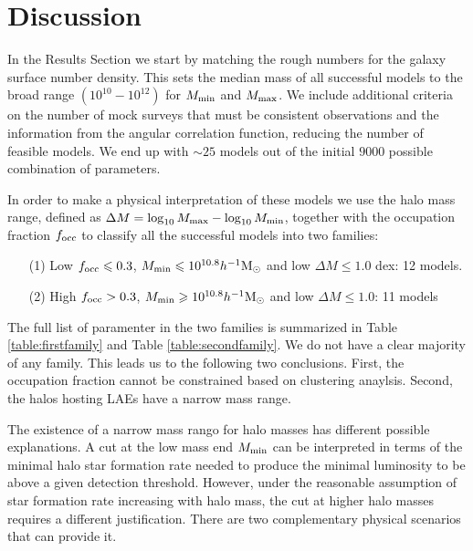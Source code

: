 \documentclass[usenatbib]{mn2e}
\newcommand{\ly}{{\ifmmode{{\rm Ly}\alpha}\else{Ly$\alpha$~}\fi}}
\newcommand{\hMsun}{{\ifmmode{h^{-1}{\rm
        {M_{\odot}}}}\else{$h^{-1}{\rm{M_{\odot}}}$}\fi}}
\begin{document}
\section{Discussion}





In the Results Section we start by matching the rough numbers for the
galaxy surface number density. This sets the median mass of all
successful models to the broad range $(10^{10}-10^{12})$ \hMsun for
$M_{\rm min}$ and $M_{\rm max}$. We include additional criteria on the
number of mock surveys that must be consistent observations
and the information from the angular correlation function, reducing
the number of feasible models. We end up with $\sim 25$ models out of
the initial $9000$ possible combination of parameters. 

In order to make a physical interpretation of these models we use 
the halo mass range, defined as $\Delta M=\log_{10}M_{\rm max} -
\log_{10}M_{\rm  min}$, together with the occupation fraction $f_{\rm
  occ}$ to classify all the successful models into two families:  


\begin{itemize}
\item[(1)] Low $f_{\rm occ}\leq 0.3$, $M_{\rm min}\leq 10^{10.8}\hMsun$ and low $\Delta M\leq 1.0$
  dex: 12 models. 
\item[(2)] High $f_{\rm occ}> 0.3$, $M_{\rm min}\geq 10^{10.8}\hMsun$ and
  low $\Delta M\leq 1.0$: 11 models 
\end{itemize}


The full list of paramenter in the two families is summarized in Table
\ref{table:firstfamily} and Table \ref{table:secondfamily}. We do not
have a clear majority of any family. This leads us to the following
two conclusions. First, the occupation fraction cannot be constrained
based on clustering anaylsis. Second, the halos hosting LAEs have a
narrow mass range.  

The existence of a narrow mass rango for halo masses has different
possible explanations. A cut at the low mass end $M_{\rm min}$ can be
interpreted in terms of the minimal halo star formation rate needed to
produce the minimal \ly  luminosity to be above a given detection
threshold.  However, under the reasonable assumption of star formation
rate increasing with halo mass, the cut at higher halo masses requires
a different justification. There are two complementary physical
scenarios that can provide it.
\end{document}
